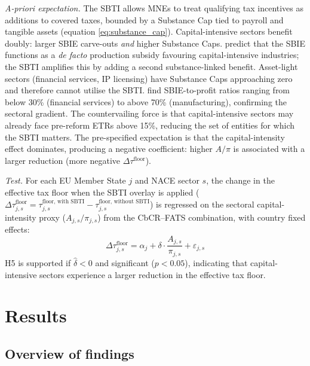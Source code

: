 \documentclass[11pt,a4paper]{article}
\begin{document}
\textit{A-priori expectation.} The SBTI allows MNEs to treat qualifying tax incentives as additions to covered taxes, bounded by a Substance Cap tied to payroll and tangible assets (equation \ref{eq:substance_cap}). Capital-intensive sectors benefit doubly: larger SBIE carve-outs \emph{and} higher Substance Caps. \citet{schjelderup2024} predict that the SBIE functions as a \emph{de facto} production subsidy favouring capital-intensive industries; the SBTI amplifies this by adding a second substance-linked benefit. Asset-light sectors (financial services, IP licensing) have Substance Caps approaching zero and therefore cannot utilise the SBTI. \citet{devereux2023} find SBIE-to-profit ratios ranging from below 30\% (financial services) to above 70\% (manufacturing), confirming the sectoral gradient. The countervailing force is that capital-intensive sectors may already face pre-reform ETRs above 15\%, reducing the set of entities for which the SBTI matters. The pre-specified expectation is that the capital-intensity effect dominates, producing a negative coefficient: higher $A/\pi$ is associated with a larger reduction (more negative $\Delta\tau^{\text{floor}}$).

\textit{Test.} For each EU Member State $j$ and NACE sector $s$, the change in the effective tax floor when the SBTI overlay is applied ($\Delta \tau_{j,s}^{\text{floor}} = \tau_{j,s}^{\text{floor, with SBTI}} - \tau_{j,s}^{\text{floor, without SBTI}}$) is regressed on the sectoral capital-intensity proxy ($A_{j,s} / \pi_{j,s}$) from the CbCR--FATS combination, with country fixed effects:
\begin{equation}\label{eq:h5_test}
\Delta \tau_{j,s}^{\text{floor}} = \alpha_j + \delta \cdot \frac{A_{j,s}}{\pi_{j,s}} + \varepsilon_{j,s}
\end{equation}
H5 is supported if $\hat{\delta} < 0$ and significant ($p < 0.05$), indicating that capital-intensive sectors experience a larger reduction in the effective tax floor.

\newpage
\section{Results}\label{sec:results}\label{sec:se_results}

\subsection{Overview of findings}\label{sec:results_overview}
\end{document}

